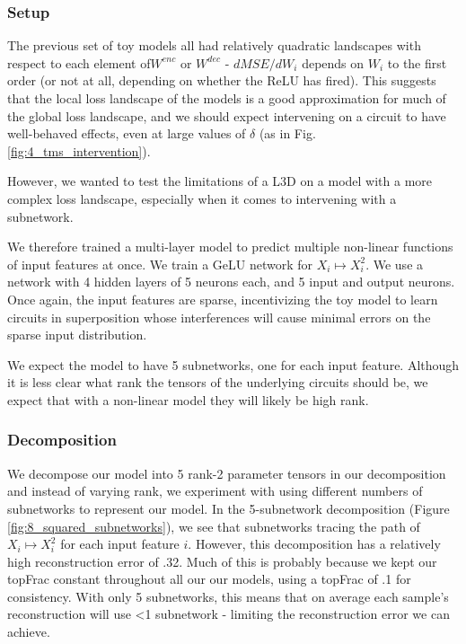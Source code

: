 \documentclass{article}
\theoremstyle{plain}
\theoremstyle{definition}
\theoremstyle{remark}
\begin{document}
\subsubsection{Setup}

The previous set of toy models all had relatively quadratic landscapes with respect to each element of$W^{enc}$ or $W^{dec}$ - $dMSE/dW_i$ depends on $W_i$ to the first order (or not at all, depending on whether the ReLU has fired). This suggests that the local loss landscape of the models is a good approximation for much of the global loss landscape, and we should expect intervening on a circuit to have well-behaved effects, even at large values of $\delta$ (as in Fig. \ref{fig:4_tms_intervention}). 

However, we wanted to test the limitations of a L3D on a model with a more complex loss landscape, especially when it comes to intervening with a subnetwork.

We therefore trained a multi-layer model to predict multiple non-linear functions of input features at once. We train a GeLU network for $X_i \mapsto X_i^2$. We use a network with 4 hidden layers of 5 neurons each, and 5 input and output neurons. Once again, the input features are sparse, incentivizing the toy model to learn circuits in superposition whose interferences will cause minimal errors on the sparse input distribution. 

We expect the model to have 5 subnetworks, one for each input feature. Although it is less clear what rank the tensors of the underlying circuits should be, we expect that with a non-linear model they will likely be high rank. 

\subsubsection{Decomposition}

We decompose our model into 5 rank-2 parameter tensors in our decomposition and instead of varying rank, we experiment with using different numbers of subnetworks to represent our model. In the 5-subnetwork decomposition (Figure \ref{fig:8_squared_subnetworks}), we see that subnetworks tracing the path of $X_i \mapsto X_i^2$ for each input feature $i$. However, this decomposition has a relatively high reconstruction error of .32. Much of this is probably because we kept our topFrac constant throughout all our our models, using a topFrac of .1 for consistency.  With only 5 subnetworks, this means that on average each sample's reconstruction will use <1 subnetwork - limiting the reconstruction error we can achieve. 
\end{document}
